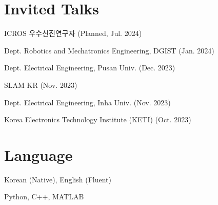 \documentclass[margin]{res}
\begin{document}
\begin{resume}
		\section{Invited Talks}
		\par ICROS 우수신진연구자 (Planned, Jul. 2024)
		\par Dept. Robotics and Mechatronics Engineering, DGIST (Jan. 2024)
		\par Dept. Electrical Engineering, Pusan Univ. (Dec. 2023)
		\par SLAM KR (Nov. 2023)
		\par Dept. Electrical Engineering, Inha Univ. (Nov. 2023)
		\par Korea Electronics Technology Institute (KETI) (Oct. 2023)
		
		\section{Language}
		\par Korean (Native), English (Fluent)
		\par Python, C++, MATLAB
				
	\end{resume}
\end{document}
